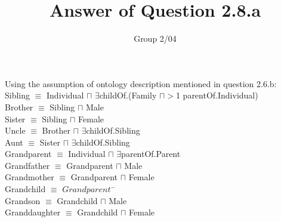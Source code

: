 \documentclass[pape=a4, fontsize=12pt]{article}
\author{Group 2/04}
\title{\textbf{Answer of Question 2.8.a}}
\date{}
\begin{document}
\maketitle
\noindent
Using the assumption of ontology description mentioned in question 2.6.b: \\

\noindent
Sibling $ \equiv $ Individual $ \sqcap$ $ \exists$childOf.(Family $ \sqcap>$1 parentOf.Individual) \\
Brother $ \equiv $ Sibling $ \sqcap $ Male \\
Sister $ \equiv $ Sibling $ \sqcap $ Female \\
Uncle $ \equiv $ Brother $ \sqcap $ $ \exists$childOf.Sibling \\
Aunt $ \equiv $ Sister $ \sqcap  $ $ \exists$childOf.Sibling \\
Grandparent $ \equiv $ Individual $ \sqcap $ $ \exists$parentOf.Parent \\
Grandfather $ \equiv $ Grandparent $ \sqcap $ Male \\
Grandmother $ \equiv $ Grandparent $ \sqcap $ Female \\
Grandchild $ \equiv $ $ Grandparent^{-} $ \\
Grandson $ \equiv $ Grandchild $ \sqcap $ Male \\
Granddaughter $ \equiv $ Grandchild $ \sqcap $ Female \\
\end{document}
